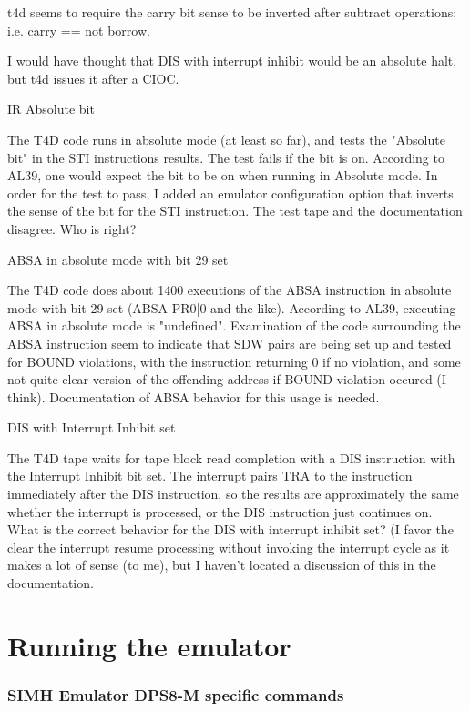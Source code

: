 \documentclass[notitlepage]{report}
\begin{document}
t4d seems to require the carry bit sense to be inverted after subtract 
operations; i.e. carry == not borrow.

I would have thought that DIS with interrupt inhibit would be an absolute halt, but t4d issues it after a CIOC.

IR Absolute bit

The T4D code runs in absolute mode (at least so far), and tests the "Absolute bit" in the STI instructions results. The test fails if the bit is on. According to AL39, one would expect the bit to be on when running in Absolute mode. In order for the test to pass, I added an emulator configuration option that inverts the sense of the bit for the STI instruction. The test tape and the documentation disagree. Who is right?

ABSA in absolute mode with bit 29 set

The T4D code does about 1400 executions of the ABSA instruction in absolute mode with bit 29 set (ABSA PR0|0 and the like). According to AL39, executing ABSA in absolute mode is "undefined". Examination of the code surrounding the ABSA instruction seem to indicate that SDW pairs are being set up and tested for BOUND violations, with the instruction returning 0 if no violation, and some not-quite-clear version of the offending address if BOUND violation occured (I think).  Documentation of ABSA behavior for this usage is needed.

DIS with Interrupt Inhibit set

The T4D tape waits for tape block read completion with a DIS instruction with the Interrupt Inhibit bit set. The interrupt pairs TRA to the instruction immediately after the DIS instruction, so the results are approximately the same whether the interrupt is processed, or the DIS instruction just continues on. What is the correct behavior for the DIS with interrupt inhibit set? (I favor the clear the interrupt resume processing without invoking the interrupt cycle as it makes a lot of sense (to me), but I haven't located a discussion of this in the documentation.


\part{Running the emulator}

\section{SIMH Emulator DPS8-M specific commands}
\end{document}
